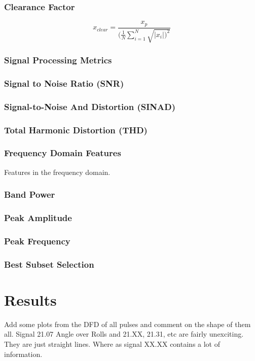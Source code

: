 \documentclass{article}
\begin{document}
\subsubsection{Clearance Factor} 
$$ x_{clear} = \frac{x_p}{(\frac{1}{N}\sum^N_{i=1}\sqrt{|x_i|)^2}} $$

\subsubsection{Signal Processing Metrics}
\subsubsection{Signal to Noise Ratio (SNR)} 
\subsubsection{Signal-to-Noise And Distortion (SINAD)} 
\subsubsection{Total Harmonic Distortion (THD)}   

\subsubsection{Frequency Domain Features}
Features in the frequency domain.
\subsubsection{Band Power}
\subsubsection{Peak Amplitude}
\subsubsection{Peak Frequency}
\subsubsection{Best Subset Selection}

\newpage  
\section{Results}
Add some plots from the DFD of all pulses and comment on the shape of them all.
Signal 21.07 Angle over Rolls and 21.XX, 21.31, etc are fairly unexciting. They are just straight lines.
Where as signal XX.XX contains a lot of information.
\end{document}
